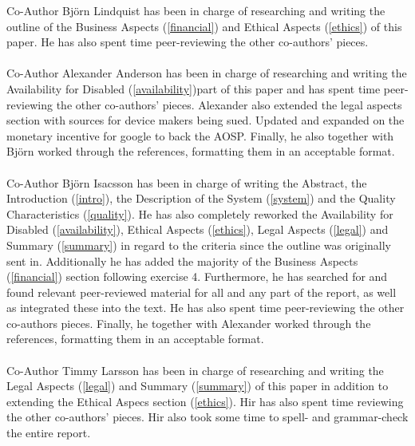 \documentclass[conference]{IEEEtran}
\begin{document}
Co-Author Björn Lindquist has been in charge of researching and writing the outline of the Business Aspects (\ref{financial}) and Ethical Aspects (\ref{ethics}) of this paper. He has also spent time peer-reviewing the other co-authors' pieces.
\\\\Co-Author Alexander Anderson has been in charge of researching and writing the Availability for Disabled (\ref{availability})part of this paper and has spent time peer-reviewing the other co-authors' pieces. Alexander also extended the legal aspects section with sources for device makers being sued. Updated and expanded on the monetary incentive for google to back the AOSP. Finally, he also together with Björn worked through the references, formatting them in an acceptable format. 
\\\\Co-Author Björn Isacsson has been in charge of writing the Abstract, the Introduction (\ref{intro}), the Description of the System (\ref{system}) and the Quality Characteristics (\ref{quality}). He has also completely reworked the Availability for Disabled (\ref{availability}), Ethical Aspects (\ref{ethics}), Legal Aspects (\ref{legal}) and Summary (\ref{summary}) in regard to the criteria since the outline was originally sent in. Additionally he has added the majority of the Business Aspects (\ref{financial}) section following exercise 4. Furthermore, he has searched for and found relevant peer-reviewed material for all and any part of the report, as well as integrated these into the text. He has also spent time peer-reviewing the other co-authors pieces. Finally, he together with Alexander worked through the references, formatting them in an acceptable format.
\\\\Co-Author Timmy Larsson has been in charge of researching and writing the Legal Aspects (\ref{legal}) and Summary (\ref{summary}) of this paper in addition to extending the Ethical Aspecs section (\ref{ethics}). Hir has also spent time reviewing the other co-authors' pieces. Hir also took some time to spell- and grammar-check the entire report.
\end{document}
